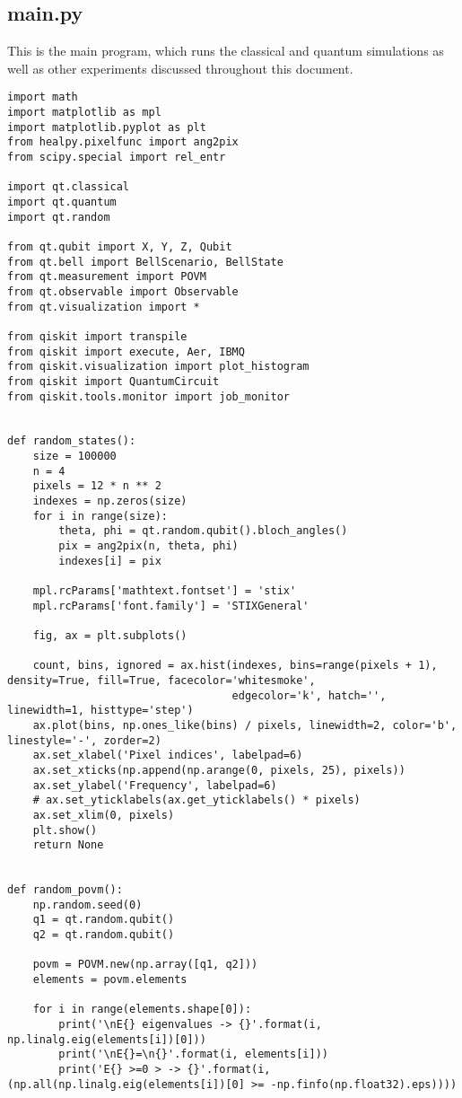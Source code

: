 \subsection{main.py}\label{section:listing_main}
This is the main program, which runs the classical and quantum simulations as well as other experiments discussed throughout this document. 
\begin{verbatim}
import math
import matplotlib as mpl
import matplotlib.pyplot as plt
from healpy.pixelfunc import ang2pix
from scipy.special import rel_entr

import qt.classical
import qt.quantum
import qt.random

from qt.qubit import X, Y, Z, Qubit
from qt.bell import BellScenario, BellState
from qt.measurement import POVM
from qt.observable import Observable
from qt.visualization import *

from qiskit import transpile
from qiskit import execute, Aer, IBMQ
from qiskit.visualization import plot_histogram
from qiskit import QuantumCircuit
from qiskit.tools.monitor import job_monitor


def random_states():
    size = 100000
    n = 4
    pixels = 12 * n ** 2
    indexes = np.zeros(size)
    for i in range(size):
        theta, phi = qt.random.qubit().bloch_angles()
        pix = ang2pix(n, theta, phi)
        indexes[i] = pix

    mpl.rcParams['mathtext.fontset'] = 'stix'
    mpl.rcParams['font.family'] = 'STIXGeneral'

    fig, ax = plt.subplots()

    count, bins, ignored = ax.hist(indexes, bins=range(pixels + 1), density=True, fill=True, facecolor='whitesmoke',
                                   edgecolor='k', hatch='', linewidth=1, histtype='step')
    ax.plot(bins, np.ones_like(bins) / pixels, linewidth=2, color='b', linestyle='-', zorder=2)
    ax.set_xlabel('Pixel indices', labelpad=6)
    ax.set_xticks(np.append(np.arange(0, pixels, 25), pixels))
    ax.set_ylabel('Frequency', labelpad=6)
    # ax.set_yticklabels(ax.get_yticklabels() * pixels)
    ax.set_xlim(0, pixels)
    plt.show()
    return None


def random_povm():
    np.random.seed(0)
    q1 = qt.random.qubit()
    q2 = qt.random.qubit()

    povm = POVM.new(np.array([q1, q2]))
    elements = povm.elements

    for i in range(elements.shape[0]):
        print('\nE{} eigenvalues -> {}'.format(i, np.linalg.eig(elements[i])[0]))
        print('\nE{}=\n{}'.format(i, elements[i]))
        print('E{} >=0 > -> {}'.format(i, (np.all(np.linalg.eig(elements[i])[0] >= -np.finfo(np.float32).eps))))


\end{verbatim}
